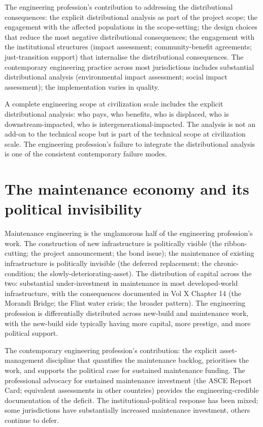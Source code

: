 The engineering profession's contribution to addressing the distributional consequences: the explicit distributional analysis as part of the project scope; the engagement with the affected populations in the scope-setting; the design choices that reduce the most negative distributional consequences; the engagement with the institutional structures (impact assessment; community-benefit agreements; just-transition support) that internalise the distributional consequences. The contemporary engineering practice across most jurisdictions includes substantial distributional analysis (environmental impact assessment; social impact assessment); the implementation varies in quality.

\begin{principle}
A complete engineering scope at civilization scale includes the explicit distributional analysis: who pays, who benefits, who is displaced, who is downstream-impacted, who is intergenerational-impacted. The analysis is not an add-on to the technical scope but is part of the technical scope at civilization scale. The engineering profession's failure to integrate the distributional analysis is one of the consistent contemporary failure modes.
\end{principle}

\section{The maintenance economy and its political invisibility}

Maintenance engineering is the unglamorous half of the engineering profession's work. The construction of new infrastructure is politically visible (the ribbon-cutting; the project announcement; the bond issue); the maintenance of existing infrastructure is politically invisible (the deferred replacement; the chronic-condition; the slowly-deteriorating-asset). The distribution of capital across the two: substantial under-investment in maintenance in most developed-world infrastructure, with the consequences documented in Vol X Chapter 14 (the Morandi Bridge; the Flint water crisis; the broader pattern). The engineering profession is differentially distributed across new-build and maintenance work, with the new-build side typically having more capital, more prestige, and more political support.

The contemporary engineering profession's contribution: the explicit asset-management discipline that quantifies the maintenance backlog, prioritises the work, and supports the political case for sustained maintenance funding. The professional advocacy for sustained maintenance investment (the ASCE Report Card; equivalent assessments in other countries) provides the engineering-credible documentation of the deficit. The institutional-political response has been mixed; some jurisdictions have substantially increased maintenance investment, others continue to defer.

